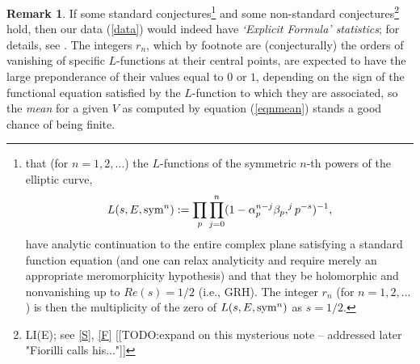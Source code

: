 \documentclass[11pt]{article}
\theoremstyle{plain}
\theoremstyle{definition}
\newtheorem{remark}[theorem]{Remark}
\numberwithin{equation}{section}
\numberwithin{figure}{section}
\numberwithin{table}{section}
\begin{document}
\begin{remark}  If some standard conjectures{\footnote{that (for $n=1,2,\dots$) the $L$-functions of the symmetric $n$-th powers of the elliptic curve, \begin{equation}
L(s, E, {\rm sym}^n): = \prod_p\prod_{j=0}^n(1- \alpha_p^{n-j}\beta_p,^jp^{-s})^{-1},
\end{equation} have analytic continuation   to the entire complex plane satisfying a standard function equation (and one can relax analyticity and require merely an appropriate meromorphicity hypothesis) and that they be holomorphic and nonvanishing up to $Re(s) =1/2$ (i.e., GRH).  The integer $r_n$ (for $n=1,2,\dots$)  is then the multiplicity of the zero of $L(s, E, {\rm sym}^n)$ as $s=1/2$. \vskip20pt }} and some non-standard conjectures{\footnote{LI(E); see  \ref{S}, \ref{F} [[TODO:expand on this mysterious note -- addressed later "Fiorilli calls his..."]]}}  hold, then our data (\ref{data}) would indeed have {\it `Explicit Formula' statistics}; for details, see \cite{S}.  The integers $r_n$, which by footnote  \label{footnote:statdist} are (conjecturally) the orders of vanishing of specific $L$-functions at their central points, are expected to have the large preponderance of their values equal to  $0$ or $1$, depending on the sign of the functional equation satisfied by the $L$-function to which they are associated,  so the {\it mean} for  a given $V$ as computed by equation (\ref{eqnmean}) stands a good chance of being finite.
\end{remark}
\end{document}
